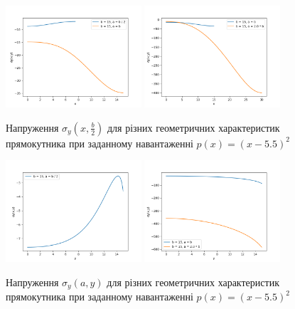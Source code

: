 \begin{figure}[H]
    \begin{center}
        \includegraphics[width=0.45\textwidth, scale=1]{images/results/static_1/sigma_y(x,b:2)1.png}
        \includegraphics[width=0.45\textwidth, scale=1]{images/results/static_1/sigma_y(x,b:2)2.png}
        \caption{Напруження $\sigma_y(x, \frac{b}{2})$ для різних геометричних характеристик прямокутника при заданному навантаженні $p(x) = (x - 5.5)^2$}\label{static_1_sigma_y(x,b:2)}
    \end{center}
\end{figure}

\begin{figure}[H]
    \begin{center}
        \includegraphics[width=0.45\textwidth, scale=1]{images/results/static_1/sigma_y(a,y)1.png}
        \includegraphics[width=0.45\textwidth, scale=1]{images/results/static_1/sigma_y(a,y)2.png}
        \caption{Напруження $\sigma_y(a, y)$ для різних геометричних характеристик прямокутника при заданному навантаженні $p(x) = (x - 5.5)^2$}\label{static_1_sigma_y(a,y)}
    \end{center}
\end{figure}

